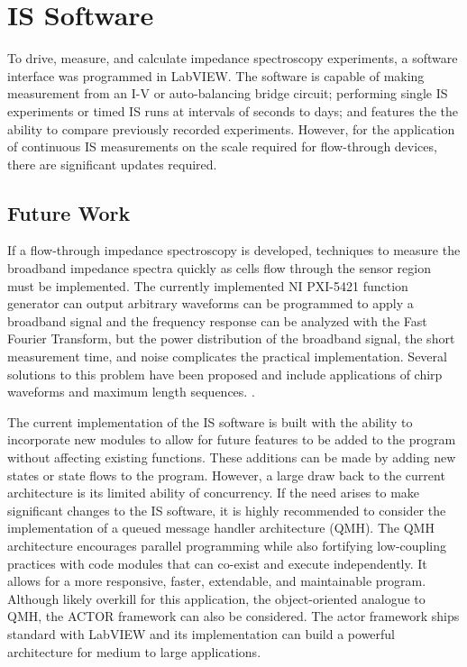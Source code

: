 \section{IS Software}
\par To drive, measure, and calculate impedance spectroscopy experiments, a software interface was programmed in LabVIEW. The software is capable of making measurement from an I-V or auto-balancing bridge circuit; performing single IS experiments or timed IS runs at intervals of seconds to days; and features the the ability to compare previously recorded experiments. However, for the application of continuous IS measurements on the scale required for flow-through devices, there are significant updates required. 

\subsection*{Future Work}

\par If a flow-through impedance spectroscopy is developed, techniques to measure the broadband impedance spectra quickly as cells flow through the sensor region must be implemented. The currently implemented NI PXI-5421 function generator can output arbitrary waveforms can be programmed to apply a broadband signal and the frequency response can be analyzed with the Fast Fourier Transform, but the power distribution of the broadband signal, the short measurement time, and noise complicates the practical implementation. Several solutions to this problem have been proposed and include applications of chirp waveforms and maximum length sequences. \cite{min_broadband_2010, sun_digital_2009,sun_broadband_2007}. 

\par The current implementation of the IS software is built with the ability to incorporate new modules to allow for future features to be added to the program without affecting existing functions. These additions can be made by adding new states or state flows to the program. However, a large draw back to the current architecture is its limited ability of concurrency. If the need arises to make significant changes to the IS software, it is highly recommended to consider the implementation of a queued message handler architecture (QMH). The QMH architecture encourages parallel programming while also fortifying low-coupling practices with code modules that can co-exist and execute independently. It allows for a more responsive, faster, extendable, and maintainable program. Although likely overkill for this application, the object-oriented analogue to QMH, the ACTOR framework can also be considered. The actor framework ships standard with LabVIEW and its implementation can build a powerful architecture for medium to large applications.

